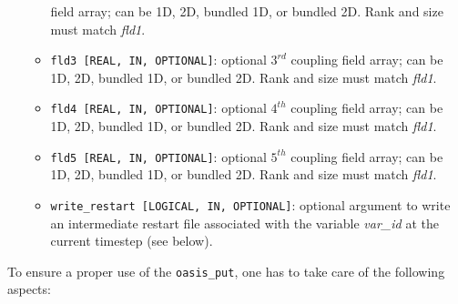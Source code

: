 \begin{itemize}
\begin{itemize}
    field array; can be 1D, 2D, bundled 1D, or bundled 2D.  Rank and size
    must match {\it fld1}.
  \item {\tt fld3 [REAL, IN, OPTIONAL]}: optional $3^{rd}$ coupling
    field array; can be 1D, 2D, bundled 1D, or bundled 2D.  Rank and size
    must match {\it fld1}.
  \item {\tt fld4 [REAL, IN, OPTIONAL]}: optional $4^{th}$ coupling
    field array; can be 1D, 2D, bundled 1D, or bundled 2D.  Rank and size
    must match {\it fld1}.
  \item {\tt fld5 [REAL, IN, OPTIONAL]}: optional $5^{th}$ coupling
    field array; can be 1D, 2D, bundled 1D, or bundled 2D.  Rank and size
    must match {\it fld1}.
  \item {\tt write\_restart [LOGICAL, IN, OPTIONAL]}: optional argument to write an 
    intermediate restart file associated with the variable {\it
      var\_id} at the current timestep (see below).
  \end{itemize}
\end{itemize}

To ensure a proper use of the {\tt oasis\_put}, one has to take care
of the following aspects:

